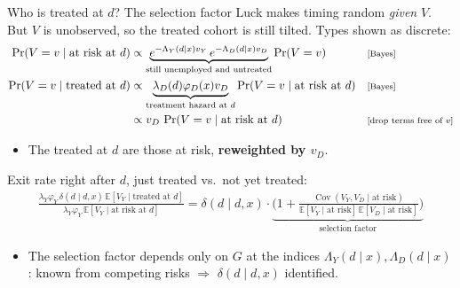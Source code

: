 \documentclass[aspectratio=169,10pt]{beamer}
\newcommand{\E}{\mathbb{E}}
\newcommand{\cov}{\operatorname{Cov}}
\newcommand{\why}[1]{\text{\scriptsize[#1]}}
\begin{document}
\begin{frame}[label=m-sf]{Who is treated at $d$? The selection factor}
  \small
  Luck makes timing random \emph{given} $V$. But $V$ is unobserved, so the treated cohort is still tilted. Types shown as discrete:
  \begin{align*}
    \Pr(V=v\mid\text{at risk at }d) &\propto \underbrace{e^{-\Lambda_Y(d\mid x)v_Y}\,e^{-\Lambda_D(d\mid x)v_D}}_{\text{still unemployed and untreated}}\Pr(V=v) && \why{Bayes} \\
    \Pr(V=v\mid\text{treated at }d) &\propto \underbrace{\lambda_D(d)\varphi_D(x)v_D}_{\text{treatment hazard at }d}\Pr(V=v\mid\text{at risk at }d) && \why{Bayes} \\
    &\propto v_D\,\Pr(V=v\mid\text{at risk at }d) && \why{drop terms free of $v$}
  \end{align*}
  \begin{itemize}
    \item The treated at $d$ are those at risk, \textbf{reweighted by $v_D$}.
  \end{itemize}
  Exit rate right after $d$, just treated vs.\ not yet treated:
  \begin{align*}
    \frac{\lambda_Y\varphi_Y\,\delta(d\mid d,x)\,\E[V_Y\mid\text{treated at }d]}{\lambda_Y\varphi_Y\,\E[V_Y\mid\text{at risk at }d]}
    = \delta(d\mid d,x)\cdot\underbrace{\Big(1+\frac{\cov(V_Y,V_D\mid\text{at risk})}{\E[V_Y\mid\text{at risk}]\,\E[V_D\mid\text{at risk}]}\Big)}_{\text{selection factor}}
  \end{align*}
  \begin{itemize}
    \item The selection factor depends only on $G$ at the indices $\Lambda_Y(d\mid x),\Lambda_D(d\mid x)$: known from competing risks $\Rightarrow$ $\delta(d\mid d,x)$ identified.
  \end{itemize}
  \vfill\hfill\hyperlink{p-sf}{}
\end{frame}
\end{document}
